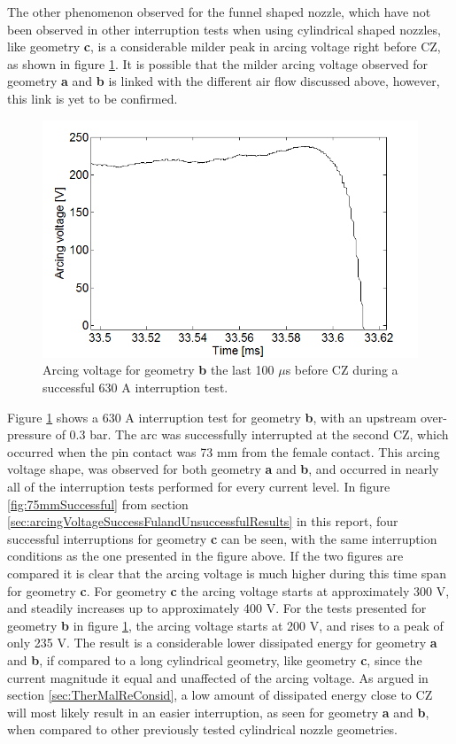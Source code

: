 \documentclass[10pt,b5paper,twoside]{article}
\begin{document}
The other phenomenon observed for the funnel shaped nozzle, which have not been observed in other interruption tests when using cylindrical shaped nozzles, like geometry \textbf{c}, is a considerable milder peak in arcing voltage right before CZ, as shown in figure \ref{fig:mildFunnelArcVlotage}. It is possible that the milder arcing voltage observed for geometry \textbf{a} and \textbf{b} is linked with the different air flow discussed above, however, this link is yet to be confirmed.

\begin{figure}[H]
\centering
\includegraphics[scale=0.5]{Bilder/Results/funnelArcDrop.PNG}
\caption{Arcing voltage for geometry \textbf{b} the last 100 $\mu$s before CZ during a successful 630 A interruption test.} \label{fig:mildFunnelArcVlotage}
\end{figure}

Figure \ref{fig:mildFunnelArcVlotage} shows a 630 A interruption test for geometry \textbf{b}, with an upstream over-pressure of 0.3 bar. The arc was successfully interrupted at the second CZ, which occurred when the pin contact was 73 mm from the female contact. This arcing voltage shape, was observed for both geometry \textbf{a} and \textbf{b}, and occurred in nearly all of the interruption tests performed for every current level. In figure \ref{fig:75mmSuccessful} from section \ref{sec:arcingVoltageSuccessFulandUnsuccessfulResults} in this report, four successful interruptions for geometry \textbf{c} can be seen, with the same interruption conditions as the one presented in the figure above. If the two figures are compared it is clear that the arcing voltage is much higher during this time span for geometry \textbf{c}. For geometry \textbf{c} the arcing voltage starts at approximately 300 V, and steadily increases up to approximately 400 V. For the tests presented for geometry \textbf{b} in figure \ref{fig:mildFunnelArcVlotage}, the arcing voltage starts at 200 V, and rises to a peak of only 235 V. The result is a considerable lower dissipated energy for geometry \textbf{a} and \textbf{b}, if compared to a long cylindrical geometry, like geometry \textbf{c}, since the current magnitude it equal and unaffected of the arcing voltage. As argued in section \ref{sec:TherMalReConsid}, a low amount of dissipated energy close to CZ will most likely result in an easier interruption, as seen for geometry \textbf{a} and \textbf{b}, when compared to other previously tested cylindrical nozzle geometries.
\end{document}
